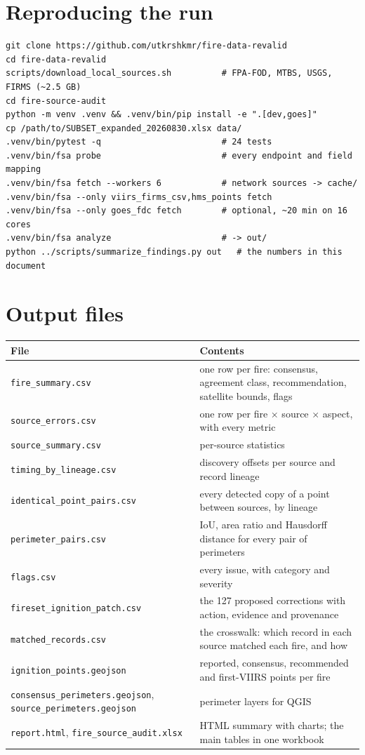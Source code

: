 \documentclass[11pt,a4paper]{article}
\begin{document}
\appendix
\section{Reproducing the run}

{\small
\begin{verbatim}
git clone https://github.com/utkrshkmr/fire-data-revalid
cd fire-data-revalid
scripts/download_local_sources.sh          # FPA-FOD, MTBS, USGS, FIRMS (~2.5 GB)
cd fire-source-audit
python -m venv .venv && .venv/bin/pip install -e ".[dev,goes]"
cp /path/to/SUBSET_expanded_20260830.xlsx data/
.venv/bin/pytest -q                        # 24 tests
.venv/bin/fsa probe                        # every endpoint and field mapping
.venv/bin/fsa fetch --workers 6            # network sources -> cache/
.venv/bin/fsa --only viirs_firms_csv,hms_points fetch
.venv/bin/fsa --only goes_fdc fetch        # optional, ~20 min on 16 cores
.venv/bin/fsa analyze                      # -> out/
python ../scripts/summarize_findings.py out   # the numbers in this document
\end{verbatim}}

\section{Output files}

\begin{table}[h]
\centering\footnotesize
\begin{tabularx}{\textwidth}{@{}lY@{}}
\toprule
File & Contents\\
\midrule
\texttt{fire\_summary.csv} & one row per fire: consensus, agreement class, recommendation, satellite bounds, flags\\
\texttt{source\_errors.csv} & one row per fire $\times$ source $\times$ aspect, with every metric\\
\texttt{source\_summary.csv} & per-source statistics\\
\texttt{timing\_by\_lineage.csv} & discovery offsets per source and record lineage\\
\texttt{identical\_point\_pairs.csv} & every detected copy of a point between sources, by lineage\\
\texttt{perimeter\_pairs.csv} & IoU, area ratio and Hausdorff distance for every pair of perimeters\\
\texttt{flags.csv} & every issue, with category and severity\\
\texttt{fireset\_ignition\_patch.csv} & the 127 proposed corrections with action, evidence and provenance\\
\texttt{matched\_records.csv} & the crosswalk: which record in each source matched each fire, and how\\
\texttt{ignition\_points.geojson} & reported, consensus, recommended and first-VIIRS points per fire\\
\texttt{consensus\_perimeters.geojson}, \texttt{source\_perimeters.geojson} & perimeter layers for QGIS\\
\texttt{report.html}, \texttt{fire\_source\_audit.xlsx} & HTML summary with charts; the main tables in one workbook\\
\bottomrule
\end{tabularx}
\end{table}
\end{document}
